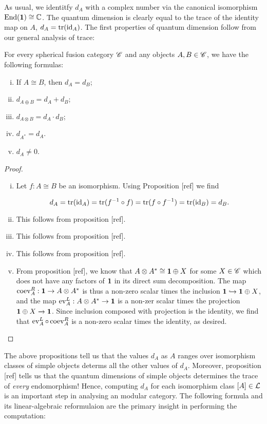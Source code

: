 As usual, we identitfy $d_A$ with a complex number via the canonical isomorphism $\operatorname{End}(\mathbf{1})\cong \mathbb{C}$. The quantum dimension is clearly equal to the trace of the identity map on $A$, $d_A=\operatorname{tr}(\operatorname{id}_A)$. The first properties of quantum dimension follow from our general analysis of trace:

\begin{proposition} For every spherical fusion category $\mathscr{C}$ and any objects $A,B\in \mathscr{C}$, we have the following formulas:

\begin{enumerate}[(i)]
\item If $A\cong B$, then $d_A=d_B$;
\item $d_{A\oplus B}=d_{A}+d_B$;
\item $d_{A\otimes B}=d_{A}\cdot d_{B}$;
\item $d_{A^*}=d_A$.
\item $d_A\neq 0$.
\end{enumerate}
\end{proposition}
\begin{proof}$\,$
\begin{enumerate}[(i)]
\item Let $f:A\cong B$ be an isomorphism. Using Proposition [ref] we find

$$d_A=\operatorname{tr}(\operatorname{id}_{A})=\operatorname{tr}(f^{-1}\circ f)=\operatorname{tr}(f\circ f^{-1})=\operatorname{tr}(\operatorname{id}_{B})=d_B.$$

\item This follows from proposition [ref].
\item This follows from proposition [ref].
\item This follows from proposition [ref].
\item From proposition [ref], we know that $A\otimes A^* \cong \mathbf{1} \oplus X$ for some $X\in \mathscr{C}$ which does not have any factors of $\mathbf{1}$ in its direct sum decomposition. The map $\operatorname{coev}^R_A: \mathbf{1} \to A\otimes A^*$ is thus a non-zero scalar times the inclusion $\mathbf{1} \hookrightarrow{} \mathbf{1}\oplus X$, and the map $\operatorname{ev}^L_A: A\otimes A^*\to \mathbf{1}$ is a non-zer scalar times the projection $\mathbf{1} \oplus X \xrightarrow{}\mathbf{1}$. Since inclusion composed with projection is the identity, we find that $\operatorname{ev}^{L}_{A}\circ \operatorname{coev}^R_{A}$ is a non-zero scalar times the identity, as desired.
\end{enumerate}
\end{proof}

The above propositions tell us that the values $d_A$ as $A$ ranges over isomorphism classes of simple objects determs all the other values of $d_A$. Moreover, proposition [ref] tells us that the quantum dimensions of simple objects determines the trace of \textit{every} endomorphism! Hence, computing $d_{A}$ for each isomorphism class $[A]\in \mathcal{L}$ is an important step in analysing an modular category. The following formula and its linear-algebraic reformulaion are the primary insight in performing the computation:

